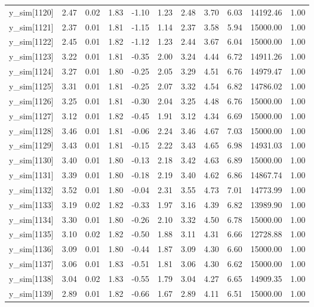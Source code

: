 \begin{table}[ht]
\begin{tabular}{rrrrrrrrrrr}
  y\_sim[1120] & 2.47 & 0.02 & 1.83 & -1.10 & 1.23 & 2.48 & 3.70 & 6.03 & 14192.46 & 1.00 \\ 
  y\_sim[1121] & 2.37 & 0.01 & 1.81 & -1.15 & 1.14 & 2.37 & 3.58 & 5.94 & 15000.00 & 1.00 \\ 
  y\_sim[1122] & 2.45 & 0.01 & 1.82 & -1.12 & 1.23 & 2.44 & 3.67 & 6.04 & 15000.00 & 1.00 \\ 
  y\_sim[1123] & 3.22 & 0.01 & 1.81 & -0.35 & 2.00 & 3.24 & 4.44 & 6.72 & 14911.26 & 1.00 \\ 
  y\_sim[1124] & 3.27 & 0.01 & 1.80 & -0.25 & 2.05 & 3.29 & 4.51 & 6.76 & 14979.47 & 1.00 \\ 
  y\_sim[1125] & 3.31 & 0.01 & 1.81 & -0.25 & 2.07 & 3.32 & 4.54 & 6.82 & 14786.02 & 1.00 \\ 
  y\_sim[1126] & 3.25 & 0.01 & 1.81 & -0.30 & 2.04 & 3.25 & 4.48 & 6.76 & 15000.00 & 1.00 \\ 
  y\_sim[1127] & 3.12 & 0.01 & 1.82 & -0.45 & 1.91 & 3.12 & 4.34 & 6.69 & 15000.00 & 1.00 \\ 
  y\_sim[1128] & 3.46 & 0.01 & 1.81 & -0.06 & 2.24 & 3.46 & 4.67 & 7.03 & 15000.00 & 1.00 \\ 
  y\_sim[1129] & 3.43 & 0.01 & 1.81 & -0.15 & 2.22 & 3.43 & 4.65 & 6.98 & 14931.03 & 1.00 \\ 
  y\_sim[1130] & 3.40 & 0.01 & 1.80 & -0.13 & 2.18 & 3.42 & 4.63 & 6.89 & 15000.00 & 1.00 \\ 
  y\_sim[1131] & 3.39 & 0.01 & 1.80 & -0.18 & 2.19 & 3.40 & 4.62 & 6.86 & 14867.74 & 1.00 \\ 
  y\_sim[1132] & 3.52 & 0.01 & 1.80 & -0.04 & 2.31 & 3.55 & 4.73 & 7.01 & 14773.99 & 1.00 \\ 
  y\_sim[1133] & 3.19 & 0.02 & 1.82 & -0.33 & 1.97 & 3.16 & 4.39 & 6.82 & 13989.90 & 1.00 \\ 
  y\_sim[1134] & 3.30 & 0.01 & 1.80 & -0.26 & 2.10 & 3.32 & 4.50 & 6.78 & 15000.00 & 1.00 \\ 
  y\_sim[1135] & 3.10 & 0.02 & 1.82 & -0.50 & 1.88 & 3.11 & 4.31 & 6.66 & 12728.88 & 1.00 \\ 
  y\_sim[1136] & 3.09 & 0.01 & 1.80 & -0.44 & 1.87 & 3.09 & 4.30 & 6.60 & 15000.00 & 1.00 \\ 
  y\_sim[1137] & 3.06 & 0.01 & 1.83 & -0.51 & 1.81 & 3.06 & 4.30 & 6.62 & 15000.00 & 1.00 \\ 
  y\_sim[1138] & 3.04 & 0.02 & 1.83 & -0.55 & 1.79 & 3.04 & 4.27 & 6.65 & 14909.35 & 1.00 \\ 
  y\_sim[1139] & 2.89 & 0.01 & 1.82 & -0.66 & 1.67 & 2.89 & 4.11 & 6.51 & 15000.00 & 1.00 \\ 

\end{tabular}
\end{table}
